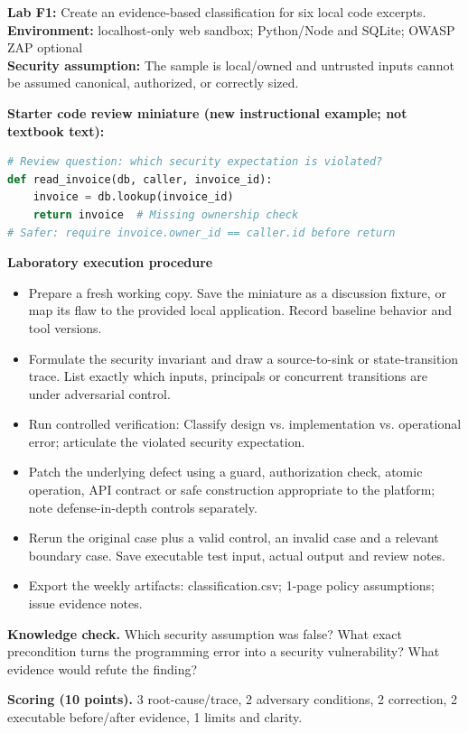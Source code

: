 \documentclass[10pt,letterpaper]{article}
\begin{document}
\begin{insight}\textbf{Lab F1:} Create an evidence-based classification for six local code excerpts.\\\textbf{Environment:} localhost-only web sandbox; Python/Node and SQLite; OWASP ZAP optional\\\textbf{Security assumption:} The sample is local/owned and untrusted inputs cannot be assumed canonical, authorized, or correctly sized.\end{insight}
\textbf{Starter code review miniature (new instructional example; not textbook text):}
\begin{lstlisting}[language=Python]
# Review question: which security expectation is violated?
def read_invoice(db, caller, invoice_id):
    invoice = db.lookup(invoice_id)
    return invoice  # Missing ownership check
# Safer: require invoice.owner_id == caller.id before return
\end{lstlisting}
\textbf{Laboratory execution procedure}
\begin{itemize}[leftmargin=*,itemsep=2pt]
\item Prepare a fresh working copy. Save the miniature as a discussion fixture, or map its flaw to the provided local application. Record baseline behavior and tool versions.
\item Formulate the security invariant and draw a source-to-sink or state-transition trace. List exactly which inputs, principals or concurrent transitions are under adversarial control.
\item Run controlled verification: Classify design vs. implementation vs. operational error; articulate the violated security expectation.
\item Patch the underlying defect using a guard, authorization check, atomic operation, API contract or safe construction appropriate to the platform; note defense-in-depth controls separately.
\item Rerun the original case plus a valid control, an invalid case and a relevant boundary case. Save executable test input, actual output and review notes.
\item Export the weekly artifacts: classification.csv; 1-page policy assumptions; issue evidence notes.
\end{itemize}
\textbf{Knowledge check.} Which security assumption was false? What exact precondition turns the programming error into a security vulnerability? What evidence would refute the finding?

\textbf{Scoring (10 points).} 3 root-cause/trace, 2 adversary conditions, 2 correction, 2 executable before/after evidence, 1 limits and clarity.
\end{document}
